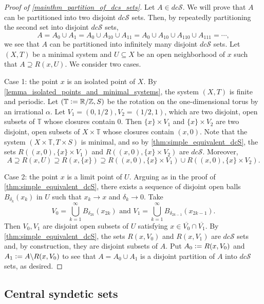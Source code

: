 \documentclass[letter,11pt]{article}
\theoremstyle{plain}
\theoremstyle{definition}
\theoremstyle{plain}
\theoremstyle{plain}
\numberwithin{equation}{section}
\newcommand{\Z}{\mathbb{Z}}
\newcommand{\R}{\mathbb{R}}
\newcommand{\T}{\mathbb{T}}
\newcommand{\defeq}{\vcentcolon=}
\renewcommand{\setminus}{\backslash}
\newcommand{\dcsyndetic}{dc\mathcal{S}}
\begin{document}
\begin{proof}[Proof of \cref{mainthm_partition_of_dcs_sets}]
    Let $A \in \dcsyndetic$. We will prove that $A$ can be partitioned into two disjoint $\dcsyndetic$ sets. 
    Then, by repeatedly partitioning the second set into disjoint $\dcsyndetic$ sets,
    \[A = A_0 \cup A_1 = A_{0} \cup A_{10} \cup A_{11} = A_{0} \cup A_{10} \cup A_{110} \cup A_{111} = \cdots,\]
    we see that $A$ can be partitioned into infinitely many disjoint $\dcsyndetic$ sets.
    Let $(X, T)$ be a minimal system and $U \subseteq X$ be an open neighborhood of $x$ such that $A \supseteq R(x, U)$. We consider two cases.

    Case 1: the point $x$ is an isolated point of $X$. By \cref{lemma_isolated_points_and_minimal_systems}, the system $(X,T)$ is finite and periodic. Let $(\T \defeq \R / \Z, S)$ be the rotation on the one-dimensional torus by an irrational $\alpha$. Let $V_1 = (0, 1/2), V_2 = (1/2, 1)$, which are two disjoint, open subsets of $\T$ whose closures contain $0$. Then $\{x\} \times V_1$ and $\{x\} \times V_2$ are two disjoint, open subsets of $X \times \T$ whose closures contain $(x, 0)$. Note that the system $(X \times \T, T \times S)$ is minimal, and so by \cref{thm:simple_equivalent_dcS}, the sets $R((x, 0), \{x\} \times V_1)$ and $R((x, 0), \{x\} \times V_2)$ are $\dcsyndetic$. Moreover,
    \[
        A \supseteq R(x, U) \supseteq R(x, \{x\}) \supseteq R((x, 0), \{x\} \times V_1) \cup R((x, 0), \{x\} \times V_2).
    \]

    Case 2: the point $x$ is a limit point of $U$. Arguing as in the proof of \cref{thm:simple_equivalent_dcS}, there exists a sequence of disjoint open balls $B_{\delta_k}(x_k)$ in $U$ such that $x_k \to x$ and $\delta_k \to 0$. Take 
    \[
        V_0 = \bigcup_{k=1}^{\infty} B_{\delta_{2k}}(x_{2k}) \text{ and } 
        V_1 = \bigcup_{k=1}^{\infty} B_{\delta_{2k - 1}}(x_{2k - 1}).
    \]
    Then $V_0, V_1$ are disjoint open subsets of $U$ satisfying $x \in \overline{V_0} \cap \overline{V_1}$. By \cref{thm:simple_equivalent_dcS}, the sets $R(x, V_0)$ and $R(x, V_1)$ are $\dcsyndetic$ sets and, by construction, they are disjoint subsets of $A$. Put $A_0 \defeq R(x,V_0)$ and $A_1 \defeq A \setminus R(x,V_0)$ to see that $A = A_0 \cup A_1$ is a disjoint partition of $A$ into $\dcsyndetic$ sets, as desired.
\end{proof}


\subsection{Central syndetic sets}
\end{document}
